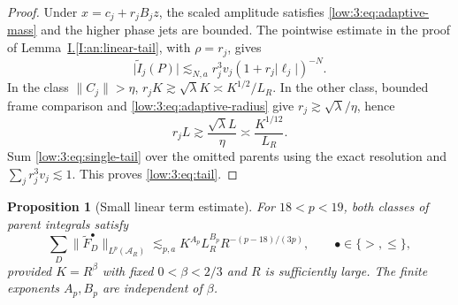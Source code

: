 \documentclass[11pt]{amsart}
\newtheorem{proposition}[theorem]{Proposition}
\theoremstyle{definition}
\theoremstyle{remark}
\newcommand{\norm}[1]{\lVert #1\rVert}
\newcommand{\abs}[1]{\lvert #1\rvert}
\numberwithin{equation}{section}
\newcommand{\partIref}[1]{\hyperref[I:#1]{I.\ref*{I:#1}}}
\begin{document}
\begin{proof}
Under $x=c_j+r_jB_jz$, the scaled amplitude satisfies \eqref{low:3:eq:adaptive-mass} and the higher phase jets are bounded. The pointwise estimate in the proof of Lemma~\partIref{an:linear-tail}, with $\rho=r_j$, gives
\begin{equation}\label{low:3:eq:single-tail}
\abs{\widetilde I_j(P)}\lesssim_{N,a} r_j^3v_j(1+r_j\abs{\ell_j})^{-N}.
\end{equation}
In the class $\|C_j\|>\eta$, $r_jK\gtrsim\sqrt\lambda K\asymp K^{1/2}/L_R$. In the other class, bounded frame comparison and \eqref{low:3:eq:adaptive-radius} give $r_j\gtrsim\sqrt\lambda/\eta$, hence
\begin{equation}\label{low:3:eq:cutoff-compatibility}
r_jL\gtrsim\frac{\sqrt\lambda L}{\eta}\asymp\frac{K^{1/12}}{L_R}.
\end{equation}
Sum \eqref{low:3:eq:single-tail} over the omitted parents using the exact resolution and $\sum_jr_j^3v_j\lesssim 1$. This proves \eqref{low:3:eq:tail}.
\end{proof}

\begin{proposition}[Small linear term estimate]\label{low:3:prop:low-assembly}
For $18<p<19$, both classes of parent integrals satisfy
\begin{equation}\label{low:3:eq:coherent-small}
\sum_D\norm{\widetilde F_D^\bullet}_{L^p(\mathcal A_R)}\lesssim_{p,a} K^{A_p}L_R^{B_p}R^{-(p-18)/(3p)},\qquad \bullet\in\{>,\leq\},
\end{equation}
provided $K=R^\beta$ with fixed $0<\beta<2/3$ and $R$ is sufficiently large. The finite exponents $A_p,B_p$ are independent of $\beta$.
\end{proposition}
\end{document}
